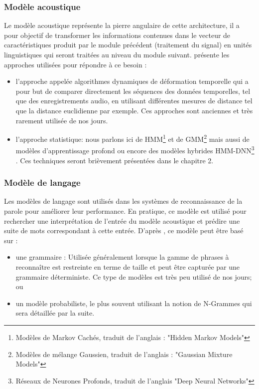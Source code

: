 \subsubsection{Modèle acoustique}
Le modèle acoustique représente la pierre angulaire de cette architecture, il a pour objectif de transformer les informations contenues dans le vecteur de caractéristiques produit par le module précédent (traitement du signal) en unités linguistiques qui seront traitées au niveau du module suivant. \cite{featureextract} présente les approches utilisées pour répondre à ce besoin :
\begin{itemize}
    \item l'approche appelée algorithmes dynamiques de déformation temporelle \cite{terministicapproach} qui a pour but de comparer directement les séquences des données temporelles, tel que des enregistrements audio, en utilisant différentes mesures de distance tel que la distance euclidienne par exemple. Ces approches sont anciennes et très rarement utilisée de nos jours.
    \item l'approche statistique: nous parlons ici de HMM\footnote{Modèles de Markov Cachés, traduit de l'anglais : "Hidden Markov Models"} \cite{hmmtuto} et de GMM\footnote{Modèles de mélange Gaussien, traduit de l'anglais : "Gaussian Mixture Models"} \cite{gmmrobust} mais aussi de modèles d'apprentissage profond ou encore des modèles hybrides HMM-DNN\footnote{Réseaux de Neurones Profonds, traduit de l'anglais "Deep Neural Networks"} \cite{dnnnew}. Ces techniques seront brièvement présentées dans le chapitre 2.	 
\end{itemize}

\subsubsection{Modèle de langage}
Les modèles de langage sont utilisés dans les systèmes de reconnaissance de la parole pour améliorer leur performance. En pratique, ce modèle est utilisé pour rechercher une interprétation de l'entrée du modèle acoustique et prédire une suite de mots correspondant à cette entrée. D'après \cite{languagemodel}, ce modèle peut être basé sur :
\begin{itemize}
    \item une grammaire : Utilisée généralement lorsque la gamme de phrases à reconnaître est restreinte en terme de taille et peut être capturée par une grammaire déterministe. Ce type de modèles est très peu utilisé de nos jours; ou 
    \item un modèle probabiliste, le plus souvent utilisant la notion de N-Grammes \cite{ngramspeech} qui sera détaillée par la suite.\\
\end{itemize}

